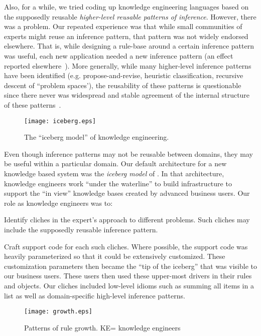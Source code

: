 \documentclass[twocolumn,global]{sys/svjour}
\begin{document}
Also, for a while, we tried coding up knowledge engineering languages
based on the supposedly reusable {\em higher-level reusable patterns
of inference}. However, there was a problem. Our repeated experience
was that while small communities of experts might reuse an inference
pattern, that pattern was not widely endorsed elsewhere. That is,
while designing a rule-base around a certain inference pattern was
useful, each new application needed a new inference pattern (an
effect reported elsewhere~\cite{linster92}). More generally, while
many higher-level inference patterns have been identified (e.g.
propose-and-revise, heuristic classification, recursive descent of
``problem spaces'), the reusability of these patterns is questionable
since there never was widespread and stable agreement of the internal
structure of these patterns~\cite{me97j,me00w}.


\begin{figure}
\begin{center}
\texttt{[image: iceberg.eps]}
\end{center}
\caption{The ``iceberg model'' of knowledge
engineering.}\label{fig:iceberg}
\end{figure}

Even though inference patterns may not be reusable between domains,
they may be useful within a particular domain. Our default
architecture for a new knowledge based system was the {\em iceberg
model} of . In that architecture, knowledge engineers
work ``under the waterline'' to build infrastructure to support the
``in view'' knowledge bases created by advanced business users. Our
role as knowledge engineers was to: \bi \item Identify cliches in the
expert's approach to different problems. Such cliches may include the
supposedly reusable inference pattern. \item Craft support code for
each such cliches. \ei Where possible, the support code was heavily
parameterized so that it could be extensively customized. These
customization parameters then became the ``tip of the iceberg'' that
was visible to our business users. These users then used these
upper-most drivers in their rules and objects. Our cliches included
low-level idioms such as summing all items in a list as well as
domain-specific high-level inference patterns.


\begin{figure}
\begin{center}
\texttt{[image: growth.eps]}
\end{center}
\caption{Patterns of rule growth. KE= knowledge
engineers}\label{fig:growth}
\end{figure}
\end{document}
